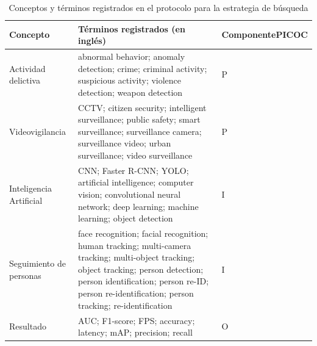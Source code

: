 \documentclass[pdflatex,sn-mathphys-num]{sn-jnl}%
\theoremstyle{thmstyleone}%
\theoremstyle{thmstyletwo}%
\theoremstyle{thmstylethree}%
\begin{document}
\begin{table}[htbp]
\caption{Conceptos y términos registrados en el protocolo para la estrategia de búsqueda}\label{tab:keywords}
\begin{tabular}{@{}L{3.0cm}L{7.35cm}>{\centering\arraybackslash}p{1.8cm}@{}}
\toprule
Concepto & Términos registrados (en inglés) & Componente\newline PICOC \\
\midrule
Actividad delictiva & abnormal behavior; anomaly detection; crime; criminal activity; suspicious activity; violence detection; weapon detection & P \\
\addlinespace
Videovigilancia & CCTV; citizen security; intelligent surveillance; public safety; smart surveillance; surveillance camera; surveillance video; urban surveillance; video surveillance & P \\
\addlinespace
Inteligencia Artificial & CNN; Faster R-CNN; YOLO; artificial intelligence; computer vision; convolutional neural network; deep learning; machine learning; object detection & I \\
\addlinespace
Seguimiento de personas & face recognition; facial recognition; human tracking; multi-camera tracking; multi-object tracking; object tracking; person detection; person identification; person re-ID; person re-identification; person tracking; re-identification & I \\
\addlinespace
Resultado & AUC; F1-score; FPS; accuracy; latency; mAP; precision; recall & O \\
\bottomrule
\end{tabular}
\end{table}
\end{document}
